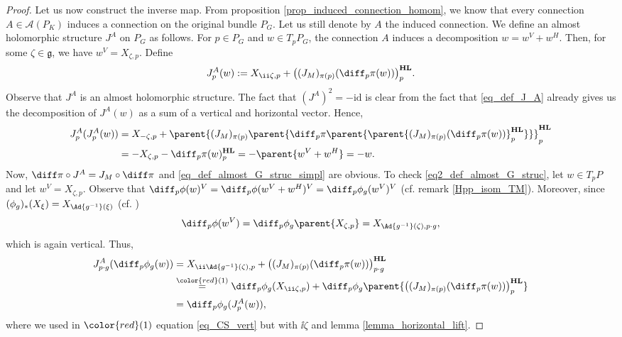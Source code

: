 \begin{proof}
    Let us now construct the inverse map. From proposition \ref{prop_induced_connection_homom}, we know that every connection \(A \in \mathscr{A}(P_K)\) induces a connection on the original bundle \(P_G\). Let us still denote by \(A\) the induced connection. We define an almost holomorphic structure \(J^A\) on \(P_G\) as follows. For \(p \in P_G\) and \(w \in T_pP_G\), the connection \(A\) induces a decomposition \(w=w^V+w^H\). Then, for some \(\zeta \in \mathfrak{g}\), we have \(w^V=X_{\zeta,p}\). Define
    \begin{equation} \label{eq_def_J_A}
    J^A_p(w):=X_{\ii \zeta,p} + \big((J_{M})_{\pi(p)}(\diff_p \pi(w)) \big)^{\mathbf{HL}}_p.
    \end{equation}
    Observe that \(J^A\) is an almost holomorphic structure. The fact that \((J^A)^2=-\mathrm{id}\) is clear from the fact that \eqref{eq_def_J_A} already gives us the decomposition of \(J^A(w)\) as a sum of a vertical and horizontal vector. Hence, 
    \begin{align*}
    J^A_p(J^A_p(w)) & =X_{-\zeta,p}+ \parent{(J_M)_{\pi(p)}\parent{\diff_p\pi\parent{\parent{(J_{M})_{\pi(p)}(\diff_p \pi(w)) }_p^{\mathbf{HL}}}}}^{\mathbf{HL}}_p \\
    &= -X_{\zeta,p}-\diff_p\pi(w)^{\mathbf{HL}}_p=-\parent{w^V+w^H}=-w.
    \end{align*}
    Now, \(\diff\pi\circ J^A=J_M \circ \diff\pi\) and \eqref{eq_def_almost_G_struc_simpl} are obvious. To check \eqref{eq2_def_almost_G_struc}, let \(w\in T_pP\) and let \(w^V=X_{\zeta, p}\). Observe that \(\diff_p\phi(w)^V=\diff_p\phi(w^V+w^H)^V=\diff_p\phi_g(w^V)^V\) (cf. remark \ref{Hpp_isom_TM}). Moreover, since \((\phi_g)_*(X_\xi)=X_{\Ad{g^{-1}}(\xi)}\) (cf. \parencite[Eq. 1.3.1]{Rudolph_2017pug})
    \begin{equation} \label{eq_CS_vert}
        \diff_p\phi(w^V)=\diff_p\phi_g\parent{X_{\zeta,p}}=X_{\Ad{g^{-1}}(\zeta), p\cdot g},
    \end{equation}
    which is again vertical. Thus,
    \begin{align*}
        J_{p\cdot g}^A(\diff_p\phi_g(w)) & = X_{\ii \Ad{g^{-1}}(\zeta), p} + \big((J_{M})_{\pi(p)}(\diff_p \pi(w)) \big)^{\mathbf{HL}}_{p\cdot g} \\
        & \overset{{\color{red}(1)}}{=} \diff_p\phi_g(X_{\ii \zeta, p})+\diff_p\phi_g \parent{\big((J_{M})_{\pi(p)}(\diff_p \pi(w)) \big)^{\mathbf{HL}}_{p}} \\
        & = \diff_p\phi_g(J^A_p(w)),
    \end{align*}
    where we used in \({\color{red}(1)}\) equation \eqref{eq_CS_vert} but with \(\ii \zeta\) and lemma \ref{lemma_horizontal_lift}. 


\end{proof}
